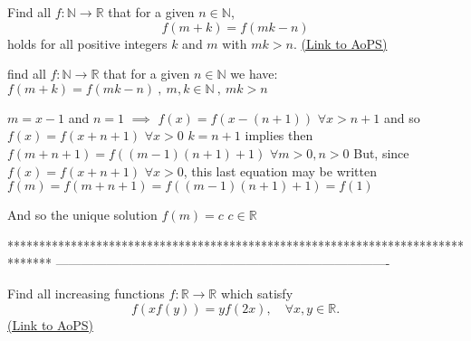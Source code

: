 \begin{problem}
	Find all $ f:\mathbb{N}\rightarrow\mathbb{R}$ that for a given $ n\in\mathbb{N}$,
\[f(m+k)=f(mk-n)\]
 holds for all positive integers $k$ and $m$ with $mk>n$.
	\flushright \href{https://artofproblemsolving.com/community/c6h166166}{(Link to AoPS)}
\end{problem}



\begin{mysolution}
	\begin{tcolorbox}find all $ f:\mathbb{N}\rightarrow\mathbb{R}$ that for a given $ n\in\mathbb{N}$ we have:
$ f(m+k) = f(mk-n)\ ,\ m,k\in\mathbb{N}\ ,\ mk > n$\end{tcolorbox}

$ m=x-1$ and $ n=1$ $ \implies$ $ f(x)=f(x-(n+1))$ $ \forall x>n+1$ and so $ f(x)=f(x+n+1)$ $ \forall x>0$
$ k=n+1$ implies then $ f(m+n+1)=f((m-1)(n+1)+1)$ $ \forall m>0,n>0$
But, since $ f(x)=f(x+n+1)$ $ \forall x>0$, this last equation may be written $ f(m)=f(m+n+1)=f((m-1)(n+1)+1)=f(1)$

And so the unique solution $ f(m)=c$ $ c\in\mathbb{R}$
\end{mysolution}
*******************************************************************************
-------------------------------------------------------------------------------

\begin{problem}
	Find all increasing functions $ f:\mathbb{R}\to\mathbb{R}$ which satisfy
\[f(xf(y))=yf(2x), \quad \forall x,y \in \mathbb R.\]
	\flushright \href{https://artofproblemsolving.com/community/c6h166410}{(Link to AoPS)}
\end{problem}



